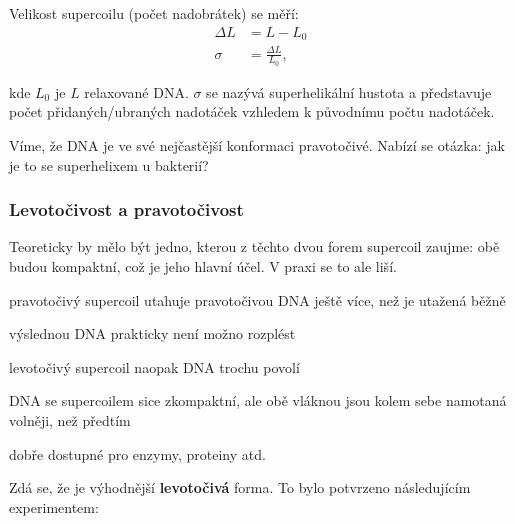 \documentclass[DIV=8]{scrreprt}
\begin{document}

Velikost supercoilu (počet nadobrátek) se měří:
\begin{align*}\Delta L &= L - L_0 \\
\sigma &= \frac{\Delta L}{L_0},\end{align*}

kde \(L_0\) je \(L\) relaxované DNA. \(\sigma\) se nazývá superhelikální hustota a představuje počet přidaných/ubraných nadotáček vzhledem k původnímu počtu nadotáček.

Víme, že DNA je ve své nejčastější konformaci pravotočivé. Nabízí se otázka: jak je to se superhelixem u bakterií?

\subsubsection{Levotočivost a pravotočivost} \label{Levotočivost a pravotočivost}


Teoreticky by mělo být jedno, kterou z těchto dvou forem supercoil zaujme: obě budou kompaktní, což je jeho hlavní účel. V praxi se to ale liší.
\begin{myItemize}[nosep]
    \item pravotočivý supercoil utahuje pravotočivou DNA ještě více, než je utažená běžně
\begin{myItemize}[nosep]
    \item výslednou DNA prakticky není možno rozplést
\end{myItemize}

    \item levotočivý supercoil naopak DNA trochu povolí
\begin{myItemize}[nosep]
    \item DNA se supercoilem sice zkompaktní, ale obě vláknou jsou kolem sebe namotaná volněji, než předtím
    \item dobře dostupné pro enzymy, proteiny atd.
\end{myItemize}

\end{myItemize}



Zdá se, že je výhodnější \textbf{levotočivá} forma. To bylo potvrzeno následujícím experimentem:
\end{document}
